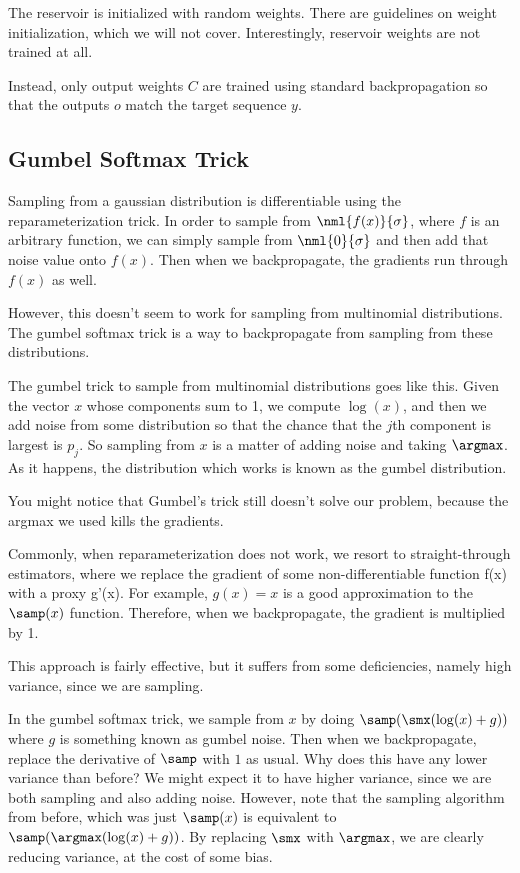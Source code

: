 \documentclass[12pt]{article}
\begin{document}
The reservoir is initialized with random weights. There are guidelines on weight initialization, which we will not cover. Interestingly, reservoir weights are not trained at all.

Instead, only output weights $C$ are trained using standard backpropagation so that the outputs $o$ match the target sequence $y$. 

\subsection{Gumbel Softmax Trick}

Sampling from a gaussian distribution is differentiable using the reparameterization trick. In order to sample from $\nml{f(x)}{\sigma}$, where $f$ is an arbitrary function, we can simply sample from $\nml{0}{\sigma}$ and then add that noise value onto $f(x)$. Then when we backpropagate, the gradients run through $f(x)$ as well.

However, this doesn't seem to work for sampling from multinomial distributions. The gumbel softmax trick is a way to backpropagate from sampling from these distributions. 

The gumbel trick to sample from multinomial distributions goes like this. Given the vector $x$ whose components sum to 1, we compute $\log(x)$, and then we add noise from some distribution so that the chance that the $j$th component is largest is $p_j$. So sampling from $x$ is a matter of adding noise and taking $\argmax$. As it happens, the distribution which works is known as the gumbel distribution.

You might notice that Gumbel's trick still doesn't solve our problem, because the argmax we used kills the gradients. 

Commonly, when reparameterization does not work, we resort to straight-through estimators, where we replace the gradient of some non-differentiable function f(x) with a proxy g'(x). For example, $g(x) = x$ is a good approximation to the $\samp(x)$ function. Therefore, when we backpropagate, the gradient is multiplied by 1.

This approach is fairly effective, but it suffers from some deficiencies, namely high variance, since we are sampling.

In the gumbel softmax trick, we sample from $x$ by doing $\samp(\smx(\log(x)+g))$ where $g$ is something known as gumbel noise. Then when we backpropagate, replace the derivative of $\samp$ with $1$ as usual. Why does this have any lower variance than before? We might expect it to have higher variance, since we are both sampling and also adding noise. However, note that the sampling algorithm from before, which was just $\samp(x)$ is equivalent to $\samp(\argmax(\log(x)+g))$. By replacing $\smx$ with $\argmax$, we are clearly reducing variance, at the cost of some bias.
\end{document}
